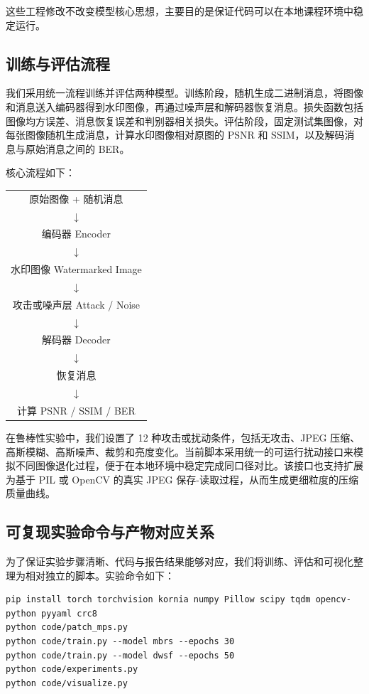 ﻿\documentclass[UTF8,zihao=5]{ctexart}
\begin{document}
这些工程修改不改变模型核心思想，主要目的是保证代码可以在本地课程环境中稳定运行。

\subsection{训练与评估流程}

我们采用统一流程训练并评估两种模型。训练阶段，随机生成二进制消息，将图像和消息送入编码器得到水印图像，再通过噪声层和解码器恢复消息。损失函数包括图像均方误差、消息恢复误差和判别器相关损失。评估阶段，固定测试集图像，对每张图像随机生成消息，计算水印图像相对原图的 PSNR 和 SSIM，以及解码消息与原始消息之间的 BER。

核心流程如下：

\begin{center}
\begin{tabular}{c}
原始图像 + 随机消息 \\
$\downarrow$ \\
编码器 Encoder \\
$\downarrow$ \\
水印图像 Watermarked Image \\
$\downarrow$ \\
攻击或噪声层 Attack / Noise \\
$\downarrow$ \\
解码器 Decoder \\
$\downarrow$ \\
恢复消息 \\
$\downarrow$ \\
计算 PSNR / SSIM / BER
\end{tabular}
\end{center}

在鲁棒性实验中，我们设置了 12 种攻击或扰动条件，包括无攻击、JPEG 压缩、高斯模糊、高斯噪声、裁剪和亮度变化。当前脚本采用统一的可运行扰动接口来模拟不同图像退化过程，便于在本地环境中稳定完成同口径对比。该接口也支持扩展为基于 PIL 或 OpenCV 的真实 JPEG 保存-读取过程，从而生成更细粒度的压缩质量曲线。

\subsection{可复现实验命令与产物对应关系}

为了保证实验步骤清晰、代码与报告结果能够对应，我们将训练、评估和可视化整理为相对独立的脚本。实验命令如下：

\begin{lstlisting}
pip install torch torchvision kornia numpy Pillow scipy tqdm opencv-python pyyaml crc8
python code/patch_mps.py
python code/train.py --model mbrs --epochs 30
python code/train.py --model dwsf --epochs 50
python code/experiments.py
python code/visualize.py
\end{lstlisting}
\end{document}
